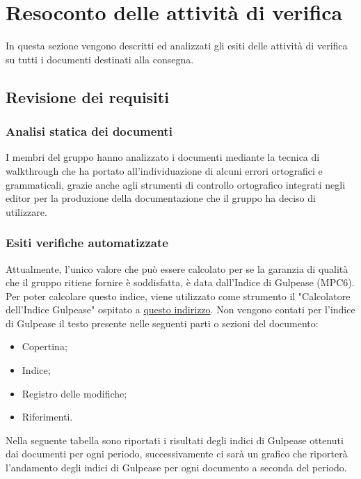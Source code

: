\section{Resoconto delle attività di verifica}
In questa sezione vengono descritti ed analizzati gli esiti delle attività di verifica su tutti i documenti destinati alla consegna.

\subsection{Revisione dei requisiti}

\subsubsection{Analisi statica dei documenti}
I membri del gruppo \Gruppo{} hanno analizzato i documenti mediante la tecnica di walkthrough che ha portato all'individuazione di 
alcuni errori ortografici e grammaticali, grazie anche agli strumenti di controllo ortografico integrati negli editor per la produzione
della documentazione che il gruppo ha deciso di utilizzare.

\subsubsection{Esiti verifiche automatizzate}
Attualmente, l'unico valore che può essere calcolato per  se la garanzia di qualità che il gruppo ritiene fornire è
soddisfatta, è data dall'Indice di Gulpease (MPC6).
Per poter calcolare questo indice, viene utilizzato come strumento il "Calcolatore dell'Indice Gulpease" ospitato a \href{https://farfalla-project.org/readability_static/}{questo indirizzo}.
Non vengono contati per l'indice di Gulpease il testo presente nelle seguenti parti o sezioni del documento:
\begin{itemize}
    \item Copertina;
    \item Indice;
    \item Registro delle modifiche;
    \item Riferimenti.
\end{itemize}
Nella seguente tabella sono riportati i risultati degli indici di Gulpease ottenuti dai documenti per ogni periodo, successivamente ci sarà un grafico che riporterà l'andamento degli indici di Gulpease per ogni documento a seconda del periodo.


